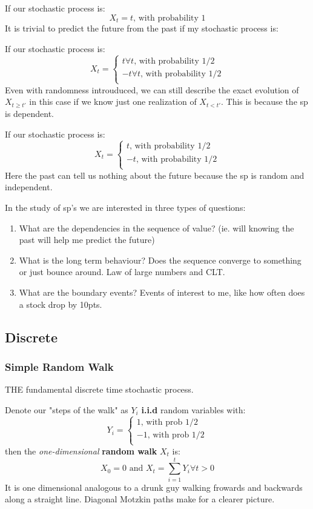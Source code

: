 \documentclass{article}
\begin{document}
If our stochastic process is: 
\[ X_t = t \text{, with probability 1} \]
It is trivial to predict the future from the past if my stochastic process is:

If our stochastic process is: 
\[ 
X_t = 
\begin{cases}
t \forall t \text{, with probability 1/2} \\
-t \forall t \text{, with probability 1/2} \\
\end{cases}
\] 
Even with randomness introuduced, we can still describe the exact evolution of $X_{t \geq t'}$ in this case if we know just one realization of $X_{t<t'}$. This is because the sp is dependent. 


If our stochastic process is: 
\[ 
X_t = 
\begin{cases}
t \text{, with probability 1/2} \\
-t \text{, with probability 1/2} \\
\end{cases}
\]
Here the past can tell us nothing about the future because the sp is random and independent.

In the study of sp's we are interested in three types of questions:
\begin{enumerate}
\item What are the dependencies in the sequence of value? (ie. will knowing the past will help me predict the future)
\item What is the long term behaviour? Does the sequence converge to something or just bounce around. Law of large numbers and CLT. 
\item What are the boundary events? Events of interest to me, like how often does a stock drop by 10pts. 
\end{enumerate}

\subsection{Discrete}
\subsubsection{Simple Random Walk}
THE fundamental discrete time stochastic process.

Denote our "steps of the walk" as $Y_i$ \textbf{i.i.d} random variables with: 
\[ Y_i = 
\begin{cases}
1 \text{, with prob 1/2} \\
-1 \text{, with prob 1/2} \\
\end{cases}
\]
then the \textit{one-dimensional} \textbf{random walk} $X_t$ is: 
\[ X_0 = 0 \text{ and } X_t = \sum_{i=1}^t Y_i \forall t>0 \]
It is one dimensional analogous to a drunk guy walking frowards and backwards along a straight line. Diagonal Motzkin paths make for a clearer picture. 
\end{document}
